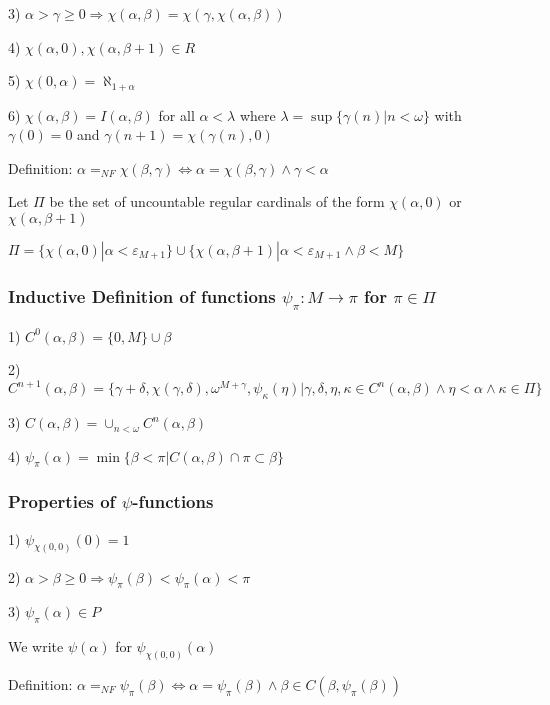 \documentclass[10pt]{article}
\begin{document}
3) \(\alpha>\gamma\geq 0 \Rightarrow \chi(\alpha,\beta)=\chi(\gamma,\chi(\alpha,\beta))\)

4) \(\chi(\alpha,0),\chi(\alpha,\beta+1) \in R\)

5) \(\chi(0,\alpha)=\aleph_{1+\alpha}\)

6) \(\chi(\alpha,\beta)=I(\alpha,\beta)\) for all \(\alpha<\lambda\) where \(\lambda=\sup\{\gamma(n)|n<\omega\}\) with \(\gamma(0)=0\) and \(\gamma(n+1)=\chi(\gamma(n),0)\)

\bigskip

Definition: \(\alpha=_{NF}\chi(\beta,\gamma) \Leftrightarrow\alpha=\chi(\beta,\gamma)\wedge\gamma<\alpha\)

\bigskip

Let \(\Pi\)  be the set of uncountable regular cardinals of the form \(\chi(\alpha,0)\) or \(\chi(\alpha,\beta+1)\) 

\(\Pi=\{\chi(\alpha,0)|\alpha<\varepsilon_{M+1}\}\cup\{\chi(\alpha,\beta+1)|\alpha<\varepsilon_{M+1}\wedge\beta<M\}\)

\subsubsection{Inductive Definition of  functions \(\psi_\pi: M\rightarrow \pi\) for \(\pi\in \Pi\)}

1) \(C^0(\alpha, \beta)=\{0,M\}\cup\beta\)

2) \(C^{n+1}(\alpha, \beta)=\{\gamma+\delta,\chi(\gamma,\delta), \omega^{M+\gamma}, \psi_\kappa(\eta)|\gamma,\delta,\eta,\kappa\in C^{n}(\alpha, \beta)\wedge\eta<\alpha\wedge\kappa\in\Pi\}\)

3) \(C(\alpha,\beta)=\cup_{n<\omega}C^{n}(\alpha, \beta)\)

4) \(\psi_\pi(\alpha)=\min\{\beta<\pi|C(\alpha,\beta)\cap \pi\subset\beta\}\)

\subsubsection{Properties of  \(\psi\)-functions}

1) \(\psi_{\chi(0,0)}(0)=1\) 

2) \(\alpha>\beta\geq 0 \Rightarrow \psi_\pi(\beta)<\psi_ \pi(\alpha)<\pi\)

3) \(\psi_\pi(\alpha)\in P\)

We write \(\psi(\alpha)\)  for \(\psi_{\chi(0,0)}(\alpha)\)

\bigskip

Definition: \(\alpha=_{NF}\psi_\pi(\beta)\Leftrightarrow\alpha=\psi_\pi(\beta) \wedge\beta\in C(\beta, \psi_\pi(\beta))\)
\end{document}
